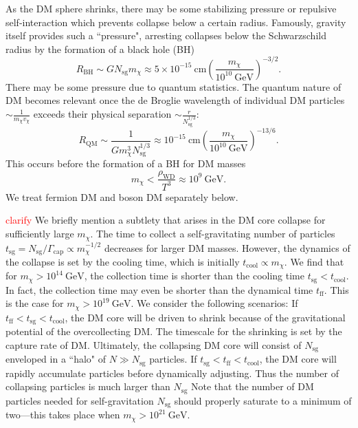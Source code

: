 \documentclass[preprintnumbers,amsmath,amssymb,prd,superscriptaddress]{revtex4}
\newcommand{\GeV}{\text{GeV}}
\newcommand{\cm}{\text{cm}}
\def\r{\right)}
\def\l{\left(}
\begin{document}
As the DM sphere shrinks, there may be some stabilizing pressure or repulsive self-interaction which prevents collapse below a certain radius.
Famously, gravity itself provides such a ``pressure", arresting collapses below the Schwarzschild radius by the formation of a black hole (BH) 
\begin{equation}
R_\text{BH} \sim G N_\text{sg} m_\chi \approx 5 \times 10^{-15} ~\cm \l \frac{m_\chi}{10^{10} ~\GeV} \r^{-3/2}.
\end{equation}
There may be some pressure due to quantum statistics.
The quantum nature of DM becomes relevant once the de Broglie wavelength of individual DM particles $\sim \frac{1}{m_\chi v_\chi}$ exceeds their physical separation $\sim \frac{r}{N_\text{sg}^{1/3}}$:
\begin{equation}
\label{eq:deg}
R_\text{QM} \sim \frac{1}{G m_\chi^3 N_\text{sg}^{1/3}} \approx 10^{-15} ~\cm \l\frac{m_\chi}{10^{10} ~\GeV}\r^{-13/6}.
\end{equation}
This occurs before the formation of a BH for DM masses
\begin{equation}
\label{eq:qm}
m_\chi < \frac{\rho_\text{WD}}{T^3} \approx 10^{9} ~\GeV.
\end{equation}
We treat fermion DM and boson DM separately below. 

\textcolor{red}{clarify}
We briefly mention a subtlety that arises in the DM core collapse for sufficiently large $m_\chi$. 
The time to collect a self-gravitating number of particles $t_\text{sg} = N_\text{sg}/\Gamma_\text{cap} \propto m_\chi^{-1/2}$ decreases for larger DM masses. 
However, the dynamics of the collapse is set by the cooling time, which is initially $t_\text{cool} \propto m_\chi$. 
We find that for $m_\chi > 10^{14} ~\GeV$, the collection time is shorter than the cooling time $t_\text{sg} < t_\text{cool}$.
In fact, the collection time may even be shorter than the dynamical time $t_\text{ff}$.
This is the case for $m_\chi > 10^{19} ~\GeV$. 
We consider the following scenarios: 
If $t_\text{ff} < t_\text{sg} <t_\text{cool}$, the DM core will be driven to shrink because of the gravitational potential of the overcollecting DM.
The timescale for the shrinking is set by the capture rate of DM. 
Ultimately, the collapsing DM core will consist of $N_\text{sg}$ enveloped in a ``halo" of $N \gg N_\text{sg}$ particles. 
If $t_\text{sg} < t_\text{ff} <t_\text{cool}$, the DM core will rapidly accumulate particles before dynamically adjusting.
Thus the number of collapsing particles is much larger than $N_\text{sg}$
Note that the number of DM particles needed for self-gravitation $N_\text{sg}$ should properly saturate to a minimum of two---this takes place when $m_\chi > 10^{21} ~\GeV$. 
\end{document}

